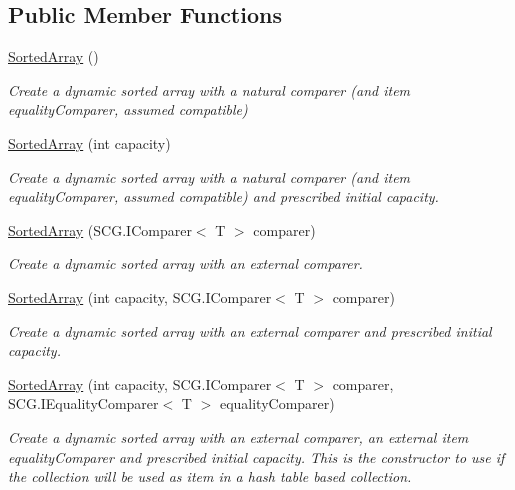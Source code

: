 \subsection*{Public Member Functions}
\begin{DoxyCompactItemize}
\item 
\hyperlink{class_c5_1_1_sorted_array_ac620a1049f1079b97dfc98d00054aea5}{Sorted\+Array} ()
\begin{DoxyCompactList}\small\item\em Create a dynamic sorted array with a natural comparer (and item equality\+Comparer, assumed compatible) \end{DoxyCompactList}\item 
\hyperlink{class_c5_1_1_sorted_array_a22c36d296c57a19406fdac742456fb5e}{Sorted\+Array} (int capacity)
\begin{DoxyCompactList}\small\item\em Create a dynamic sorted array with a natural comparer (and item equality\+Comparer, assumed compatible) and prescribed initial capacity. \end{DoxyCompactList}\item 
\hyperlink{class_c5_1_1_sorted_array_aa591c8b8b6b1b451adf647cf4cea1a3f}{Sorted\+Array} (S\+C\+G.\+I\+Comparer$<$ T $>$ comparer)
\begin{DoxyCompactList}\small\item\em Create a dynamic sorted array with an external comparer. \end{DoxyCompactList}\item 
\hyperlink{class_c5_1_1_sorted_array_a0fc0cbd634dec39be7dcdcfa79ee091f}{Sorted\+Array} (int capacity, S\+C\+G.\+I\+Comparer$<$ T $>$ comparer)
\begin{DoxyCompactList}\small\item\em Create a dynamic sorted array with an external comparer and prescribed initial capacity. \end{DoxyCompactList}\item 
\hyperlink{class_c5_1_1_sorted_array_a3a6212e14ac566c7cb83e6a26ca8c00b}{Sorted\+Array} (int capacity, S\+C\+G.\+I\+Comparer$<$ T $>$ comparer, S\+C\+G.\+I\+Equality\+Comparer$<$ T $>$ equality\+Comparer)
\begin{DoxyCompactList}\small\item\em Create a dynamic sorted array with an external comparer, an external item equality\+Comparer and prescribed initial capacity. This is the constructor to use if the collection will be used as item in a hash table based collection. \end{DoxyCompactList}\item 

\end{DoxyCompactItemize}
